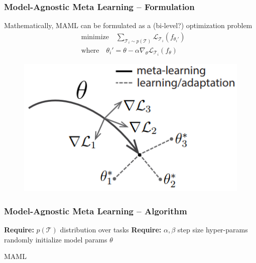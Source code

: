 
\begin{frame}
\frametitle{Model-Agnostic Meta Learning -- Formulation}

Mathematically, MAML can be formulated as a (bi-level?) optimization problem
\begin{align*}
    & \text{minimize} \quad \sum\limits_{\mathcal{T}_i\sim p(\mathcal{T})} \mathcal{L}_{\mathcal{T}_i} (f_{\theta_i'}) \\
    & \text{where} \quad \theta_i' = \theta - \alpha \nabla_{\theta} \mathcal{L}_{\mathcal{T}_i}(f_{\theta})
\end{align*}

\begin{figure}
    \centering
    \includegraphics[keepaspectratio,width=.65\textwidth]{images/maml.png}
\end{figure}

\end{frame}


\begin{frame}
\frametitle{Model-Agnostic Meta Learning -- Algorithm}

\begin{algorithm}[H]
\SetAlgoNoLine
\DontPrintSemicolon
{\bfseries Require:} $p(\mathcal{T})$ distribution over tasks\;
{\bfseries Require:} $\alpha, \beta$ step size hyper-params\;
randomly initialize model params $\theta$\;
\caption{MAML\cite{finn2017maml}}
\end{algorithm}

\end{frame}


